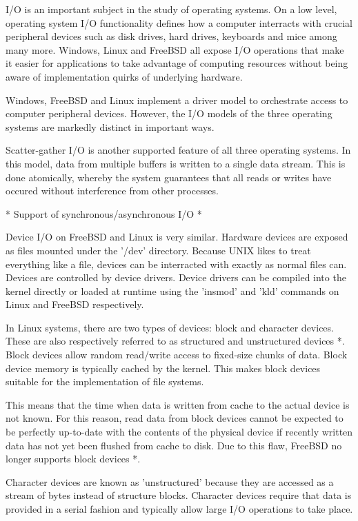 I/O is an important subject in the study of operating systems.  On a low level, operating system I/O functionality defines how a computer interracts with crucial peripheral devices such as disk drives, hard drives, keyboards and mice among many more.  Windows, Linux and FreeBSD all expose I/O operations that make it easier for applications to take advantage of computing resources without being aware of implementation quirks of underlying hardware.

Windows, FreeBSD and Linux implement a driver model to orchestrate access to computer peripheral devices.  However, the I/O models of the three operating systems are markedly distinct in important ways.

	Scatter-gather I/O is another supported feature of all three operating systems.  In this model, data from multiple buffers is written to a single data stream.  This is done atomically, whereby the system guarantees that all reads or writes have occured without interference from other processes. 

* Support of synchronous/asynchronous I/O *

Device I/O on FreeBSD and Linux is very similar.  Hardware devices are exposed as files mounted under the '/dev' directory.  Because UNIX likes to treat everything like a file, devices can be interracted with exactly as normal files can.  Devices are controlled by device drivers.  Device drivers can be compiled into the kernel directly or loaded at runtime using the 'insmod' and 'kld' commands on Linux and FreeBSD respectively.

In Linux systems, there are two types of devices: block and character devices.  These are also respectively referred to as structured and unstructured devices *.  Block devices allow random read/write access to fixed-size chunks of data.  Block device memory is typically cached by the kernel.  This makes block devices suitable for the implementation of file systems.

  This means that the time when data is written from cache to the actual device is not known.  For this reason, read data from block devices cannot be expected to be perfectly up-to-date with the contents of the physical device if recently written data has not yet been flushed from cache to disk.  Due to this flaw, FreeBSD no longer supports block devices *.

  Character devices are known as 'unstructured' because they are accessed as a stream of bytes instead of structure blocks.
  Character devices require that data is provided in a serial fashion and typically allow large I/O operations to take place.





